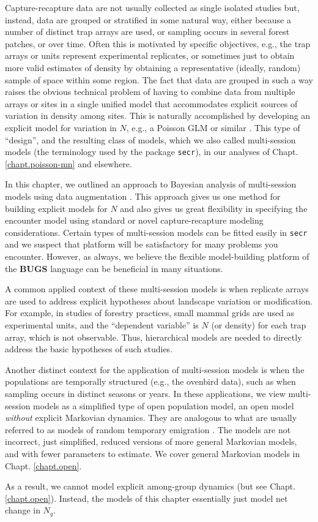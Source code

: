 Capture-recapture data are not usually collected as single isolated
studies but, instead, data are grouped or stratified in some natural
way, either because a number of distinct trap arrays are used, or
sampling occurs in several forest patches, or over time. Often this is
motivated by specific objectives, e.g., the trap arrays or units
represent experimental replicates, or sometimes just to obtain more
valid estimates of density by obtaining a representative (ideally,
random) sample of space within some region.  The fact that data are
grouped in such a way raises the obvious technical problem of having
to combine data from multiple arrays or sites in a single unified
model that accommodates explicit sources of variation in density among
sites.  This is naturally accomplished by developing an explicit model
for variation in $N$, e.g., a Poisson GLM or similar
\citep{converse_royle:2012, royle_etal:2012arXiv}. This type of ``design'', and
the resulting class of models, which we also called multi-session
models (the terminology used by
the package \mbox{\tt secr}), in our analyses of
Chapt. \ref{chapt.poisson-mn} and elsewhere.

In this chapter, we outlined an approach to Bayesian analysis of
multi-session models using data augmentation
\citet{converse_royle:2012, royle_converse:2013}.  This
approach gives us one method for building explicit models for $N$
and also gives us
great flexibility in specifying the encounter model using standard or
novel capture-recapture modeling considerations. Certain types of
multi-session models can be fitted easily in \mbox{\tt secr} and we
suspect that platform will be satisfactory for many problems you
encounter. However, as always, we believe the flexible model-building
platform of the {\bf BUGS} language can be beneficial in many
situations. 

A common applied context of these multi-session models is when
replicate arrays are used to address explicit hypotheses about
landscape variation or modification. For example, in studies of
forestry practices, small mammal grids are used as experimental units,
and the ``dependent variable'' is $N$ (or density) for each trap
array, which is not observable.  Thus, hierarchical models are needed
to directly address the basic hypotheses of such studies.  

Another
distinct context for the application of multi-session models is when
the populations are temporally structured (e.g., the ovenbird data),
such as when sampling occurs in distinct seasons or years. 
In these applications, we
view multi-session models as a simplified type of open population
model, an open model {\it without} explicit Markovian dynamics. They
are analogous to what are usually referred to as models of random
temporary emigration \citep{kendall_etal:1997, chandler_etal:2011}.
The models are not incorrect, just simplified, reduced versions of
more general Markovian models, and with fewer parameters to estimate.
We cover general Markovian models in Chapt. \ref{chapt.open}.

 As a result, we cannot
model explicit among-group dynamics
(but see Chapt. 
\ref{chapt.open}). Instead, the models of this chapter essentially
just model net change in $N_{g}$.
